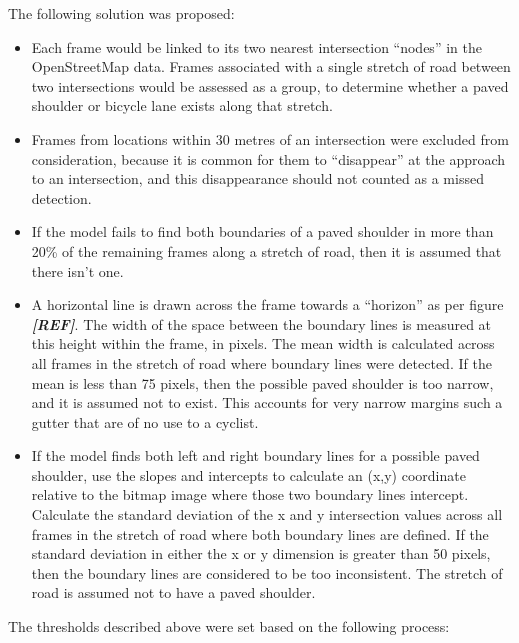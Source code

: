 \documentclass[11pt,twoside]{report}
\newcommand{\remark}[1]{{\bf \em [\marginpar{$\Leftarrow$}#1]}}
\begin{document}
The following solution was proposed:

\begin{itemize}
\item{Each frame would be linked to its two nearest intersection ``nodes'' in the  OpenStreetMap data.  Frames associated with a single stretch of road between two intersections would be assessed as a group, to determine whether a paved shoulder or bicycle lane exists along that stretch.}
\item{Frames from locations within 30 metres of an intersection were excluded from consideration, because it is common for them to ``disappear'' at the approach to an intersection, and this disappearance should not counted as a missed detection.}
\item{If the model fails to find both boundaries of a paved shoulder in more than 20\% of the remaining frames along a stretch of road, then it is assumed that there isn't one.}
\item{A horizontal line is drawn across the frame towards a ``horizon'' as per figure \remark{REF}.  The width of the space between the boundary lines is measured at this height within the frame, in pixels.  The mean width is calculated across all frames in the stretch of road where boundary lines were detected.  If the mean is less than 75 pixels, then the possible paved shoulder is too narrow, and it is assumed not to exist.  This accounts for very narrow margins such a gutter that are of no use to a cyclist.}
\item{If the model finds both left and right boundary lines for a possible paved shoulder, use the slopes and intercepts to calculate an (x,y) coordinate relative to the bitmap image where those two boundary lines intercept.  Calculate the standard deviation of the x and y intersection values across all frames in the stretch of road where both boundary lines are defined.  If the standard deviation in either the x or y dimension is greater than 50 pixels, then the boundary lines are considered to be too inconsistent.  The stretch of road is assumed not to have a paved shoulder.}
\end{itemize}

The thresholds described above were set based on the following process:
\end{document}
